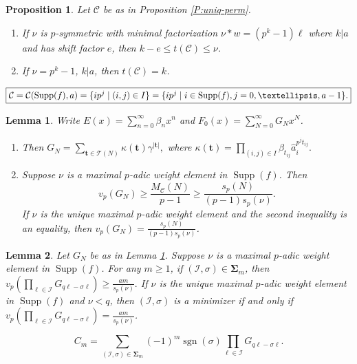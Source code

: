 \documentclass[10pt,a4paper]{amsart}
\newtheorem{proposition}{Proposition}
\newtheorem{lemma}{Lemma}
\DeclareMathOperator{\Supp}{Supp}
\newcommand{\bSig}{\mathbf\Sigma}
\newcommand{\bt}{\mathbf{t}}
\newcommand{\cC}{\mathcal{C}}
\newcommand{\cI}{\mathcal{I}}
\newcommand{\cT}{\mathcal{T}}
\DeclareMathOperator{\sgn}{sgn}
\begin{document}
\begin{proposition}
\label{P:bounded_min2}
Let $\cC$ be as in Proposition \ref{P:uniq-perm}.
\begin{enumerate}
\item
If $\nu$ is $p$-symmetric with minimal factorization 
$\nu * w = (p^k-1)\ell$ where $k|a$ and has shift factor $e$,  
then $k-e\le t(\cC)\le \nu$. 
\item 
If $\nu=p^k-1$, $k|a$, then $t(\cC)=k$.
\end{enumerate}
\end{proposition}

\begin{equation}\label{E:coin-set2}
\fbox{$\cC=\cC(\Supp(f),a)=\{ip^j\mid (i,j)\in I\}=\{ip^j\mid i\in\Supp(f), j=0,\ldots,a-1\}.$}
\end{equation}

\begin{lemma}
\label{L:G_N1}
Write
$E(x)=\sum_{n=0}^{\infty} \beta_n x^n$ and 
$F_0(x)=\sum_{N=0}^{\infty} G_N x^N$.
\begin{enumerate}
\item Then 
$
G_N = \sum_{\bt \in \cT(N)}\kappa(\bt) \gamma^{|\bt|},
$
where 
$
\kappa(\bt)= \prod_{(i,j)\in I}\beta_{t_{ij}}\hat a_i^{p^j t_{ij}}.
$
\item Suppose $\nu$ is a maximal $p$-adic weight element in $\Supp(f)$.
Then 
$$v_p(G_N)
\ge \frac{M_\cC(N)}{p-1}
\ge \frac{s_p(N)}{(p-1)s_p(\nu)}.$$ 
If $\nu$ is the unique maximal $p$-adic weight element and the second inequality is an equality, then 
$v_p(G_N)=\frac{s_p(N)}{(p-1)s_p(\nu)}$.
\end{enumerate}

\end{lemma}

\begin{lemma}
\label{L:G_N}
Let $G_N$ be as in Lemma \ref{L:G_N1}.
Suppose $\nu$ is a maximal $p$-adic weight element in $\Supp(f)$.
For any $m\ge 1$, if $(\cI,\sigma)\in \bSig_m$, then  
    $
        v_p\left(\prod_{\ell\in \cI} G_{q\ell - \sigma \ell}
            \right) \ge \frac{am}{s_p(\nu)}.
    $
If $\nu$ is the unique maximal $p$-adic weight element in $\Supp(f)$ and
$\nu<q$, then 
$(\cI,\sigma)$ is a minimizer if and only if  
$v_p\left(\prod_{\ell\in \cI} G_{q\ell - \sigma \ell}
            \right) = \frac{am}{s_p(\nu)}$.
\end{lemma}

\begin{equation}
\label{E:C_m} 
C_m=\sum_{(\cI,\sigma)\in \bSig_m}(-1)^m\sgn(\sigma)\prod_{\ell\in \cI}G_{q\ell-\sigma\ell}.   
\end{equation}
\end{document}
